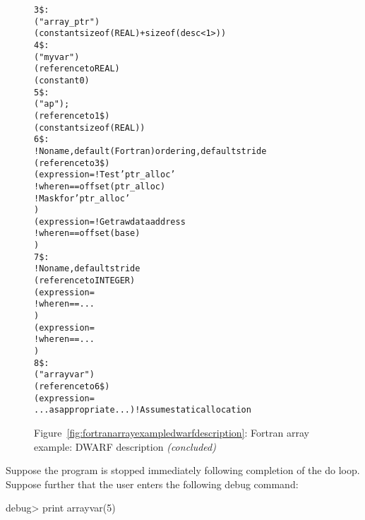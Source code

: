 \begin{figure}
\begin{dwflisting}
\begin{alltt}
3\$: \DWTAGstructuretype
        \DWATname("array\_ptr")
        \DWATbytesize(constant sizeof(REAL) + sizeof(desc<1>))
4\$:     \DWTAGmember
            \DWATname("myvar")
            \DWATtype(reference to REAL)
            \DWATdatamemberlocation(constant 0)
5\$:     \DWTAGmember
            \DWATname("ap");
            \DWATtype(reference to 1\$)
            \DWATdatamemberlocation(constant sizeof(REAL))
6\$: \DWTAGarraytype
        ! No name, default (Fortran) ordering, default stride
        \DWATtype(reference to 3\$)
        \DWATallocated(expression=       ! Test 'ptr\_alloc' 
            \DWOPpushobjectaddress
            \DWOPlitn                  ! where n == offset(ptr\_alloc)
            \DWOPplus
            \DWOPderef
            \DWOPlittwo                    ! Mask for 'ptr\_alloc' 
            \DWOPand)
        \DWATdatalocation(expression=   ! Get raw data address
            \DWOPpushobjectaddress
            \DWOPlitn                  ! where n == offset(base)
            \DWOPplus
            \DWOPderef)
7\$:     \DWTAGsubrangetype
            ! No name, default stride
            \DWATtype(reference to INTEGER)
            \DWATlowerbound(expression=
                \DWOPpushobjectaddress
                \DWOPlitn              ! where n == ...
                \DWOPplus
                \DWOPderef)
            \DWATupperbound(expression=
                \DWOPpushobjectaddress
                \DWOPlitn              ! where n == ...
                \DWOPplus
                \DWOPderef)
8\$: \DWTAGvariable
        \DWATname("arrayvar")
        \DWATtype(reference to 6\$)
        \DWATlocation(expression=
            ...as appropriate...)       ! Assume static allocation
\end{alltt}
\end{dwflisting}
\begin{center}
\vspace{3mm}
Figure~\ref{fig:fortranarrayexampledwarfdescription}: Fortran array example: DWARF description \textit{(concluded)}
\end{center}
\end{figure}

Suppose 
the program is stopped immediately following completion
of the do loop. Suppose further that the user enters the
following debug command:
\par %
\vspace{2mm}
\begin{nlnlisting}
debug> print arrayvar(5)%
\end{nlnlisting}

